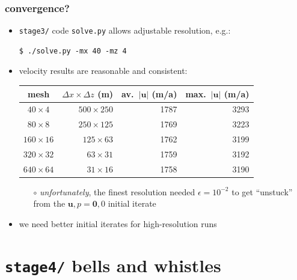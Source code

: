 \documentclass[10pt,
               hyperref={colorlinks,citecolor=DeepPink4,linkcolor=black,urlcolor=blue},
               svgnames]{beamer}
\newcommand{\bu}{\mathbf{u}}
\newcommand{\eps}{\epsilon}
\begin{document}
\begin{frame}[fragile]
\frametitle{convergence?}

\begin{itemize}
\item \texttt{stage3/} code \texttt{solve.py} allows adjustable resolution, e.g.:
\begin{Verbatim}
$ ./solve.py -mx 40 -mz 4
\end{Verbatim}
\item velocity results are reasonable and consistent:

\medskip
\begin{center}
\small
\begin{tabular}{c|rrr}
mesh           &   $\Delta x\times \Delta z$ (m) & av.~$|\bu|$ (m/a) & max.~$|\bu|$ (m/a) \\ \hline
$40\times 4$   &   $500 \times 250$ &        1787 &         3293 \\
$80\times 8$   &   $250 \times 125$ &        1769 &         3223 \\
$160\times 16$ &    $125 \times 63$ &        1762 &         3199 \\
$320\times 32$ &     $63 \times 31$ &        1759 &         3192 \\
$640\times 64$ &     $31 \times 16$ &        1758 &         3190
\end{tabular}
\normalsize
\end{center}

    \begin{itemize}
    \item[$\circ$] \emph{unfortunately}, the finest resolution needed $\eps=10^{-2}$ to get ``unstuck'' from the $\bu,p=\mathbf{0},0$ initial iterate
    \end{itemize}
\item we need \alert{better initial iterates} for high-resolution runs
\end{itemize}
\end{frame}


\section{\texttt{stage4/} \qquad bells and whistles}
\end{document}
